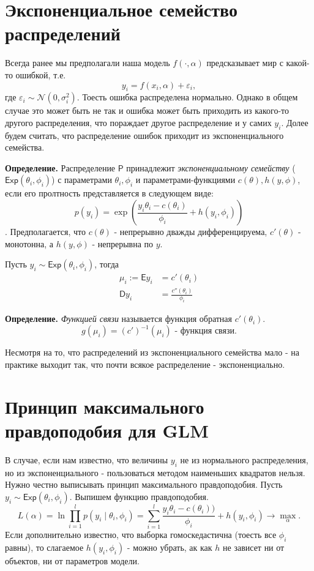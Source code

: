 \section*{Экспоненциальное семейство распределений}
Всегда ранее мы предполагали наша модель $f(\cdot, \alpha)$ предсказывает мир с какой-то ошибкой, т.е.
$$
y_i = f(x_i, \alpha) + \varepsilon_i,
$$
где $\varepsilon_i \sim \mathcal{N}(0, \sigma_i^2)$. Тоесть ошибка распределена нормально. Однако в общем случае это может быть не так и ошибка может быть приходить из какого-то другого распределения, что пораждает другое распределение и у самих $y_i$. Долее будем считать, что распределение ошибок приходит из экспоненциального семейства.

\noindent\textbf{Определение.} Распределение $\mathsf{P}$ принадлежит \textit{экспоненциальному семейству} ($\mathsf{Exp}(\theta_i, \phi_i)$) с параметрами $\theta_i, \phi_i$ и параметрами-функциями $c(\theta), h(y, \phi)$, если его пролтность представляется в следующем виде:
$$
p(y_i) = \exp\left(
  \frac{y_i\theta_i - c(\theta_i)}{\phi_i} + h(y_i, \phi_i)
\right)
$$.
Предполагается, что $c(\theta)$ - непрерывно дважды дифференцируема, $c'(\theta)$ - монотонна, а $h(y, \phi)$ - непрерывна по $y$.

Пусть $y_i \sim \mathsf{Exp}(\theta_i, \phi_i)$, тогда
\begin{align*}
  \mu_i := \mathsf{E}y_i &= c'(\theta_i)\\
  \mathsf{D}y_i &= \frac{c''(\theta_i)}{\phi_i}
\end{align*}

\noindent\textbf{Определение.} \textit{Функцией связи} называется функция обратная $c'(\theta_i)$.
$$
g(\mu_i) = (c')^{-1}(\mu_i) \text{ - функция связи.}
$$

Несмотря на то, что распределений из экспоненциального семейства мало - на практике выходит так, что почти всякое распределение - экспоненциально.

\section*{Принцип максимального правдоподобия для GLM}
В случае, если нам известно, что величины $y_i$ не из нормального распределения, но из экспоненциального - пользоваться методом наименьших квадратов нельзя. Нужно честно выписывать принцип максимального правдоподобия.
Пусть $y_i \sim \mathsf{Exp}(\theta_i, \phi_i)$. Выпишем функцию правдоподобия.
$$
L(\alpha) = \ln \prod_{i=1}^l p(y_i \mid \theta_i, \phi_i) = \sum_{i=1}^l \frac{y_i \theta_i - c(\theta_i))}{\phi_i} + h(y_i, \phi_i) \to \max_\alpha.
$$
Если дополнительно известно, что выборка гомоскедастична (тоесть все $\phi_i$ равны), то слагаемое $h(y_i, \phi_i)$ - можно убрать, ак как $h$ не зависет ни от объектов, ни от параметров модели.

